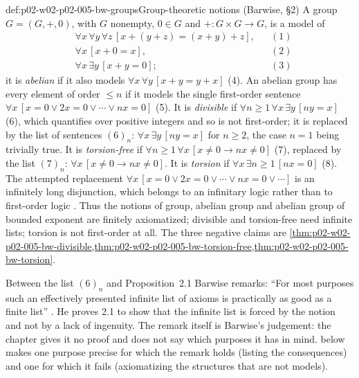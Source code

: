 \begin{hbexample}{def:p02-w02-p02-005-bw-groups}{Group-theoretic notions (Barwise, \S2)}
A group \(G=(G,+,0)\), with \(G\) nonempty, \(0\in G\) and
\(+:G\times G\to G\), is a model of
\[
\begin{aligned}
&\forall x\,\forall y\,\forall z\,[x+(y+z)=(x+y)+z], &&(1)\\
&\forall x\,[x+0=x], &&(2)\\
&\forall x\,\exists y\,[x+y=0]; &&(3)
\end{aligned}
\]
it is \emph{abelian} if it also models
\(\forall x\,\forall y\,[x+y=y+x]\) (4).  An abelian group has every element
of order \(\leq n\) if it models the single first-order sentence
\(\forall x\,[x=0\lor 2x=0\lor\cdots\lor nx=0]\) (5).  It is
\emph{divisible} if \(\forall n\geq1\,\forall x\,\exists y\,[ny=x]\) (6),
which quantifies over positive integers and so is not first-order; it is
replaced by the list of sentences \((6)_n\):
\(\forall x\,\exists y\,[ny=x]\) for \(n\geq2\), the case \(n=1\) being
trivially true.  It is \emph{torsion-free} if
\(\forall n\geq1\,\forall x\,[x\neq0\to nx\neq0]\) (7), replaced by the
list \((7)_n\): \(\forall x\,[x\neq0\to nx\neq0]\).  It is \emph{torsion}
if \(\forall x\,\exists n\geq1\,[nx=0]\) (8).  The attempted replacement
\(\forall x\,[x=0\lor 2x=0\lor\cdots\lor nx=0\lor\cdots]\) is an infinitely
long disjunction, which belongs to an infinitary logic rather than to
first-order logic \cite[ch.~A.1, \S2, pp.~7--9]{Barwise1977FirstOrder}.
Thus the notions of group, abelian group and abelian group of bounded
exponent are finitely axiomatized; divisible and torsion-free need infinite lists; torsion is
not first-order at all.  The three negative claims are
\cref{thm:p02-w02-p02-005-bw-divisible,thm:p02-w02-p02-005-bw-torsion-free,thm:p02-w02-p02-005-bw-torsion}.
\end{hbexample}

Between the list \((6)_n\) and Proposition~2.1 Barwise remarks:
``For most purposes such an effectively presented infinite list of axioms
is practically as good as a finite list''
\cite[ch.~A.1, \S2, p.~8]{Barwise1977FirstOrder}.  He proves 2.1 to show
that the infinite list is forced by the notion and not by a lack of
ingenuity.  The remark itself is Barwise's judgement: the chapter gives it
no proof and does not say which purposes it has in mind.
 below makes one purpose
precise for which the remark holds (listing the consequences) and one for
which it fails (axiomatizing the structures that are not models).

